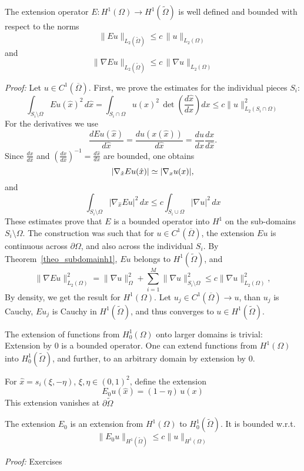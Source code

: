 \begin{theorem} The extension operator $E : H^1(\Omega) \rightarrow H^1(\widetilde \Omega)$ is well defined and bounded with respect to the norms
$$
\| E u \|_{L_2(\widetilde \Omega)} \leq c \, \| u \|_{L_2(\Omega)}
$$
and
$$
\| \nabla E u \|_{L_2(\widetilde \Omega)} \leq c \, \| \nabla u \|_{L_2(\Omega)}
$$
\end{theorem}
{\em Proof:} Let $u \in C^1(\overline \Omega)$. First, we prove the estimates
for the individual pieces $S_i$:
$$
\int_{S_i \setminus \Omega} E u (\hat x)^2 \, d \hat x =
\int_{S_i \cap \Omega} u (x)^2 \, \det \left( \frac{d \hat x}{d x} \right) d x \leq
c \| u \|_{L_2(S_i \cap \Omega)}^2 
$$
For the derivatives we use
$$
\frac{d E u(\hat x)}{d\hat x} = \frac{d u(x(\hat x))}{d \hat x} =
        \frac{d u}{dx} \frac{dx}{d \hat x}.
$$
Since $\frac{d x}{d \hat x}$ and $(\frac{d x}{d \hat x})^{-1} = \frac{d \hat x}{dx}$ are bounded, one obtains
$$
| \nabla_{\hat x} E u (\hat x) | \simeq | \nabla_x u(x) |,
$$
and 
$$
\int_{S_i \setminus \Omega} | \nabla_{\hat x} E u |^2 \, dx \leq 
        c \int_{S_i \cup \Omega} | \nabla u |^2 \, dx
$$
These estimates prove that $E$ is a bounded operator into $H^1$ on the
sub-domains $S_i \setminus \Omega$. The construction 
was such that for $u \in C^1(\overline \Omega)$, the extension $E u$ is 
continuous across $\partial \Omega$, and also across the individual $S_i$.
By Theorem~\ref{theo_subdomainh1}, $E u $ belongs
to $H^1 (\widetilde \Omega)$, and
$$
\| \nabla E u \|_{L_2(\Omega)}^2 = 
\| \nabla u \|_{\Omega}^2 + \sum_{i=1}^M \| \nabla u \|_{S_i \setminus \Omega}^2 \leq c \| \nabla u \|_{L_2(\Omega)}^2,
$$
By density, we get the result for $H^1(\Omega)$. Let $u_j  \in C^1(\overline \Omega) \rightarrow  u$, than $u_j$ is Cauchy, $E u_j$ is Cauchy in $H^1(\widetilde \Omega)$, and thus converges to $u \in H^1(\widetilde \Omega)$.

\bigskip

The extension of functions from $H_0^1(\Omega)$ onto larger domains is
trivial: Extension by $0$ is a bounded operator.
One can extend functions from $H^1(\Omega)$ into $H_0^1(\widetilde \Omega)$,
and further, to an arbitrary domain by extension by $0$.

For $\hat x = s_i(\xi, -\eta)$, $\xi, \eta \in (0,1)^2$, define the extension
$$
E_0 u (\hat x) = (1-\eta) \, u(x) 
$$
This extension vanishes at $\partial \widetilde \Omega$

\begin{theorem}
The extension $E_0$ is an extension from $H^1(\Omega)$ to $H_0^1(\widetilde \Omega)$. It is bounded w.r.t. 
$$
\| E_0 u \|_{H^1(\widetilde \Omega)} \leq c \| u \|_{H^1(\Omega)}
$$
\end{theorem}
\noindent
{\em Proof:} Exercises

